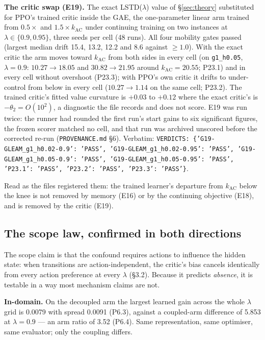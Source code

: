 \textbf{The critic swap (E19).} The exact LSTD($\lambda$) value of
\S\ref{sec:theory} substituted for PPO's trained critic inside the GAE, the
one-parameter linear arm trained from $0.5\times$ and $1.5\times
k_{\mathrm{AC}}$ under continuing training on two instances at
$\lambda\in\{0.9, 0.95\}$, three seeds per cell (48 runs). All four mobility
gates passed (largest median drift 15.4, 13.2, 12.2 and 8.6 against $\ge1.0$).
With the exact critic the arm moves toward $k_{\mathrm{AC}}$ from both sides in
every cell (on \texttt{g1\_h0.05}, $\lambda=0.9$: $10.27\to18.05$ and
$30.82\to21.95$ around $k_{\mathrm{AC}}=20.55$; P23.1) and in every cell
without overshoot (P23.3); with PPO's own critic it drifts to under-control
from below in every cell ($10.27\to1.14$ on the same cell; P23.2). The trained
critic's fitted value curvature is $+0.03$ to $+0.12$ where the exact critic's
is $-\theta_2 = O(10^2)$, a diagnostic the file records and does not score. E19
was run twice: the runner had rounded the first run's start gains to six
significant figures, the frozen scorer matched no cell, and that run was
archived unscored before the corrected re-run (\texttt{PROVENANCE.md} \S6).
Verbatim: \texttt{VERDICTS: \{'G19-GLEAM\_g1\_h0.02-0.9': 'PASS', 'G19-GLEAM\_g1\_h0.02-0.95': 'PASS', 'G19-GLEAM\_g1\_h0.05-0.9': 'PASS', 'G19-GLEAM\_g1\_h0.05-0.95': 'PASS', 'P23.1': 'PASS', 'P23.2': 'PASS', 'P23.3': 'PASS'\}}.

Read as the files registered them: the trained learner's departure from
$k_{\mathrm{AC}}$ below the knee is not removed by memory (E16) or by the
continuing objective (E18), and is removed by the critic (E19).

\subsection{The scope law, confirmed in both
directions}

The scope claim is that the confound requires actions to influence the
hidden state: when transitions are action-independent, the critic's bias
cancels identically from every action preference at every \(\lambda\)
(\S3.2). Because it predicts \emph{absence}, it is testable in a way most
mechanism claims are not.

\textbf{In-domain.} On the decoupled arm the largest learned gain across
the whole \(\lambda\) grid is 0.0079 with spread 0.0091 (P6.3), against
a coupled-arm difference of 5.853 at \(\lambda = 0.9\) --- an arm ratio
of 3.52 (P6.4). Same representation, same optimiser, same evaluator;
only the coupling differs.

